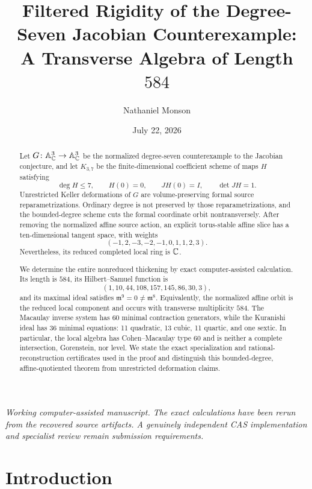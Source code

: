 \documentclass[11pt,reqno]{amsart}
\title[Filtered rigidity]{Filtered Rigidity of the Degree-Seven Jacobian
Counterexample:\\A Transverse Algebra of Length \(584\)}
\author{Nathaniel Monson}
\date{July 22, 2026}
\begin{document}
\begin{abstract}
Let \(G\colon\mathbb A^3_{\mathbb C}\to\mathbb A^3_{\mathbb C}\) be the normalized degree-seven
counterexample to the Jacobian conjecture, and let \(K_{3,7}\) be the
finite-dimensional coefficient scheme of maps \(H\) satisfying
\[
\deg H\le7,\qquad H(0)=0,\qquad JH(0)=I,\qquad \det JH=1.
\]
Unrestricted Keller deformations of \(G\) are volume-preserving formal source
reparametrizations.  Ordinary degree is not preserved by those
reparametrizations, and the bounded-degree scheme cuts the formal coordinate
orbit nontransversely.  After removing the normalized affine source action,
an explicit torus-stable affine slice has a ten-dimensional tangent
space, with weights
\[
(-1,2,-3,-2,-1,0,1,1,2,3).
\]
Nevertheless, its reduced completed local ring is \(\mathbb C\).

We determine the entire nonreduced thickening by exact computer-assisted
calculation.  Its length is \(584\), its Hilbert--Samuel function is
\[
(1,10,44,108,157,145,86,30,3),
\]
and its maximal ideal satisfies \(\mathfrak m^9=0\ne\mathfrak m^8\).
Equivalently, the normalized affine orbit is the reduced local component and
occurs with transverse multiplicity \(584\).  The Macaulay inverse system has
60 minimal contraction generators, while the
Kuranishi ideal has 36 minimal equations: 11 quadratic, 13 cubic, 11
quartic, and one sextic.  In particular, the local algebra has
Cohen--Macaulay type 60 and is neither a complete intersection, Gorenstein,
nor level.  We state the exact specialization and rational-reconstruction
certificates used in the proof and distinguish this bounded-degree,
affine-quotiented theorem from unrestricted deformation claims.
\end{abstract}

\maketitle

\begin{center}
\small\emph{Working computer-assisted manuscript.  The exact calculations
have been rerun from the recovered source artifacts.  A genuinely independent
CAS implementation and specialist review remain submission requirements.}
\end{center}

\section{Introduction}
\label{sec:introduction}
\end{document}
